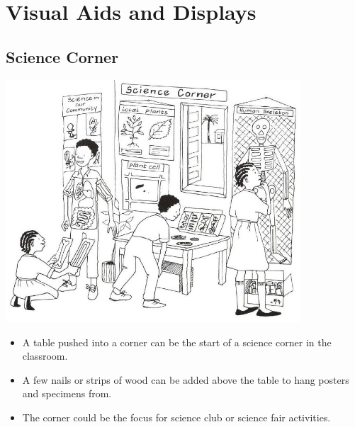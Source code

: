 \chapter{Visual Aids and Displays}


\section{Science Corner}

\begin{center}
\includegraphics[width=11cm]{./img/vso/science-corner.jpg}
\end{center}

\begin{itemize}
\item A table pushed into a corner can be the start of a science corner in
the classroom.
\item A few nails or strips of wood can be added above the table to hang
posters and specimens from.
\item The corner could be the focus for science club or science fair activities.
\end{itemize}


